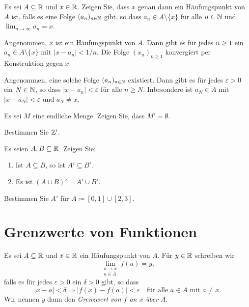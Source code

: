 \documentclass[a4paper,10pt]{article}
\begin{document}
\begin{question}
 Es sei $A \subseteq \mathbb{R}$ und $x \in \mathbb{R}$. Zeigen Sie, dass $x$ genau dann ein Häufungspunkt von $A$ ist, falls es eine Folge $(a_n)_{n \in \mathbb{N}}$ gibt, so dass $a_n \in A \setminus \{x\}$ für alle $n \in \mathbb{N}$ und $\lim_{n \to \infty} a_n = x$.
\end{question}
\begin{solution}
 Angenommen, $x$ ist ein Häufungspunkt von $A$. Dann gibt es für jedes $n \geq 1$ ein $a_n \in A \setminus \{x\}$ mit $|x-a_n| < 1/n$. Die Folge $(x_n)_{n \geq 1}$ konvergiert per Konstruktion gegen $x$.
 
 Angenommen, eine solche Folge $(a_n)_{n \in \mathbb{N}}$ existiert. Dann gibt es für jedes $\varepsilon > 0$ ein $N \in \mathbb{N}$, so dass $|x-a_n| < \varepsilon$ für alle $n \geq N$. Inbesondere ist $a_N \in A$ mit $|x-a_N| < \varepsilon$ und $a_N \neq x$.
\end{solution}


\begin{question}
 Es sei $M$ eine endliche Menge. Zeigen Sie, dass $M' = \emptyset$.
\end{question}


\begin{question}
 Bestimmen Sie $\mathbb{Z}'$.
\end{question}


\begin{question}
 Es seien $A, B \subseteq \mathbb{R}$. Zeigen Sie:
 \begin{enumerate}
  \item
   Ist $A \subseteq B$, so ist $A' \subseteq B'$.
  \item
   Es ist $(A \cup B)' = A' \cup B'$.
 \end{enumerate}
\end{question}


\begin{question}
 Bestimmen Sie $A'$ für $A \coloneqq [0,1] \cup [2,3]$.
\end{question}





\section{Grenzwerte von Funktionen}


\begin{defi}
 Es sei $A \subseteq \mathbb{R}$ und $x \in \mathbb{R}$ ein Häufungspunkt von $A$. Für $y \in \mathbb{R}$ schreiben wir
 \[
  \lim_{\substack{a \to x \\ a \in A}} f(a) = y,
 \]
 falls es für jedes $\varepsilon > 0$ ein $\delta > 0$ gibt, so dass
 \[
  |x-a| < \delta \Rightarrow |f(x)-f(a)| < \varepsilon
  \quad
  \text{für alle $a \in A$ mit $a \neq x$}.
 \]
 Wir nennen $y$ dann den \emph{Grenzwert von $f$ an $x$ über $A$}.
\end{defi}
\end{document}

